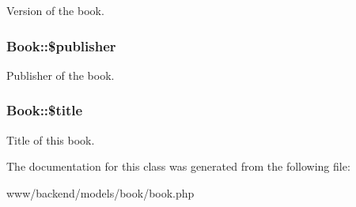 \label{classBook_a9716a8f1fd9835afde5b49620ff7477c}
Version of the book. \hypertarget{classBook_afe1783a0dd9a9c2762afd950cbef2f23}{
\subsubsection[{\$publisher}]{\setlength{\rightskip}{0pt plus 5cm}Book::\$publisher}}
\label{classBook_afe1783a0dd9a9c2762afd950cbef2f23}
Publisher of the book. \hypertarget{classBook_a4dbd5bfc30228cdd5fef4e2c9c2c1a5a}{
\subsubsection[{\$title}]{\setlength{\rightskip}{0pt plus 5cm}Book::\$title}}
\label{classBook_a4dbd5bfc30228cdd5fef4e2c9c2c1a5a}
Title of this book. 

The documentation for this class was generated from the following file:\begin{DoxyCompactItemize}
\item 
www/backend/models/book/book.php\end{DoxyCompactItemize}
